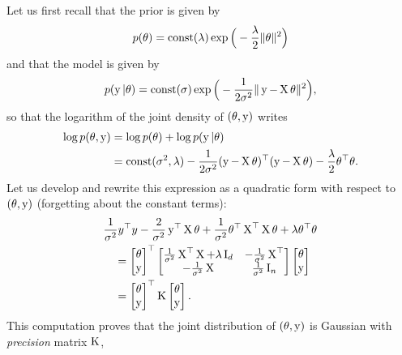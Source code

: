 Let us first recall that the prior is given by
\begin{equation*}
	p(\theta) = \text{const}(\lambda) \exp \Big(- \frac{\lambda}{2} \norm{\theta}^2 \Big)
\end{equation*}
and that the model is given by
\begin{equation*}
	p(\by | \theta) = \text{const}(\sigma) \exp\Big( -\frac{1}{2 \sigma^2} \norm{\by - \bX \theta}^2 \Big),
\end{equation*}
so that the logarithm of the joint density of $(\theta, \by)$ writes
\begin{align*}
	\log p(\theta, \by) &= \log p(\theta) + \log p(\by | \theta) \\
	&= \text{const}(\sigma^2, \lambda) - \frac{1}{2 \sigma^2} (\by - \bX \theta)^\top (\by - \bX \theta) 
	- \frac{\lambda}{2} \theta^\top \theta.
\end{align*}
Let us develop and rewrite this expression as a quadratic form with respect to $(\theta, \by)$ (forgetting about the constant terms):
\begin{align*}
	&\frac{1}{\sigma^2} y^\top y - \frac{2}{\sigma^2} \by^\top \bX \theta + \frac{1}{\sigma^2} \theta^\top \bX^\top \bX \theta + \lambda \theta^\top \theta \\
	& \quad = 
	\begin{bmatrix}
	\theta \\
	\by
	\end{bmatrix}^\top
	\begin{bmatrix}
	\frac{1}{\sigma^2} \bX^\top \bX + \lambda \bI_d & - \frac{1}{\sigma^2} \bX^\top  \\
	- \frac{1}{\sigma^2} \bX & \frac{1}{\sigma^2} \bI_n
	\end{bmatrix}
	\begin{bmatrix}
	\theta \\
	\by
	\end{bmatrix} \\
	& \quad = \begin{bmatrix}
	\theta \\
	\by
	\end{bmatrix}^\top
	\bK
	\begin{bmatrix}
	\theta \\
	\by
	\end{bmatrix}.
\end{align*}
This computation proves that the joint distribution of $(\theta, \by)$ is Gaussian with \emph{precision} matrix $\bK$,%
